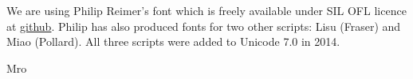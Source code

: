 We are using Philip Reimer's font which is freely available under SIL OFL licence at \href{http://phjamr.github.io/mro.html}{github}. Philip has also produced fonts for two other scripts: Lisu (Fraser) and Miao (Pollard). All three scripts were added to Unicode 7.0 in 2014.



\begin{scriptexample}[]{Mro}
\end{scriptexample}








